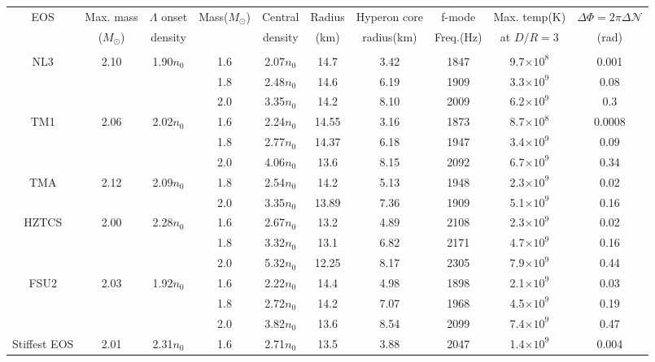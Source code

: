 \documentclass[%
 reprint,
 amsmath,amssymb,
 aps,
]{revtex4-2}
\begin{document}
\begin{table}
\begin{adjustwidth}{-3em}{}
\begin{center}
    \begin{tabular}{|c|c|c|c|c|c|c|c|c|c|}
    \hline
    EOS & Max. mass & $\Lambda$ onset & Mass($M_{\odot}$) & Central  & Radius & Hyperon core& f-mode  & Max. temp(K)  & $\Delta \Phi = 2\pi \Delta\mathcal{N}$  \\ 
    & ($M_{\odot}$) & density & & density & (km) &  radius(km) & Freq.(Hz) &  at $D/R = 3$ & (rad) \\
    \hline
    \multicolumn{10}{c}{} \\
    \hline
    NL3 & 2.10 & 1.90$n_0$ & 1.6 & 2.07$n_0$ & 14.7 & 3.42 & 1847 & 9.7$\times 10^8$ & 0.001 \\
    ~\cite{Chen2014}& & & 1.8 & 2.48$n_0$ & 14.6 & 6.19 & 1909 & 3.3$\times 10^9$ & 0.08 \\
    & & & 2.0 & 3.35$n_0$ & 14.2 & 8.10 & 2009 & 6.2$\times 10^9$ & 0.3 \\
    \hline
    TM1 & 2.06 & 2.02$n_0$ & 1.6 & 2.24$n_0$ & 14.55 & 3.16 & 1873 & 8.7$\times 10^8$ & 0.0008 \\
    ~\cite{Steiner_2013}& & & 1.8 & 2.77$n_0$ & 14.37 & 6.18 & 1947 & 3.4$\times 10^9$ & 0.09 \\
    & & & 2.0 & 4.06$n_0$ & 13.6 & 8.15 & 2092 & 6.7$\times 10^9$ & 0.34 \\
    \hline
    TMA & 2.12 & 2.09$n_0$ & 1.8 & 2.54$n_0$ & 14.2 & 5.13 & 1948 & 2.3$\times 10^9$ & 0.02 \\
    ~\cite{Steiner_2013}& & & 2.0 & 3.35$n_0$ & 13.89 & 7.36 & 1909 & 5.1$\times 10^9$ & 0.16\\
    \hline
    HZTCS & 2.00 & 2.28$n_0$ & 1.6 & 2.67$n_0$ & 13.2 & 4.89 & 2108 & 2.3$\times 10^9$ & 0.02 \\
    ~\cite{HZTCS}& & & 1.8 & 3.32$n_0$ & 13.1 & 6.82 & 2171 & 4.7$\times 10^9$ & 0.16 \\
    & & & 2.0 & 5.32$n_0$ & 12.25 & 8.17 & 2305 & 7.9$\times 10^9$ & 0.44 \\
    \hline
    FSU2 & 2.03 & 1.92$n_0$ & 1.6 & 2.22$n_0$ & 14.4 & 4.98 & 1898 & 2.1$\times 10^9$ & 0.03 \\
    ~\cite{Chen2014}& & & 1.8 & 2.72$n_0$ & 14.2 & 7.07 & 1968 & 4.5$\times 10^9$ & 0.19 \\
    & & & 2.0 & 3.82$n_0$ & 13.6 & 8.54 & 2099 & 7.4$\times 10^9$ & 0.47 \\
    \hline 
    Stiffest EOS & 2.01 & 2.31$n_0$ & 1.6 & 2.71$n_0$ & 13.5 & 3.88 & 2047 & 1.4$\times 10^9$ & 0.004 \\

\end{tabular}
\end{center}
\end{adjustwidth}
\end{table}
\end{document}

